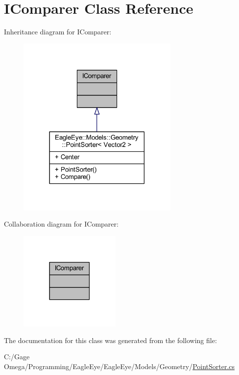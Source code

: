 \hypertarget{class_i_comparer}{}\section{I\+Comparer Class Reference}
\label{class_i_comparer}


Inheritance diagram for I\+Comparer\+:\nopagebreak
\begin{figure}[H]
\begin{center}
\leavevmode
\includegraphics[width=225pt]{class_i_comparer__inherit__graph}
\end{center}
\end{figure}


Collaboration diagram for I\+Comparer\+:\nopagebreak
\begin{figure}[H]
\begin{center}
\leavevmode
\includegraphics[width=141pt]{class_i_comparer__coll__graph}
\end{center}
\end{figure}


The documentation for this class was generated from the following file\+:\begin{DoxyCompactItemize}
\item 
C\+:/\+Gage Omega/\+Programming/\+Eagle\+Eye/\+Eagle\+Eye/\+Models/\+Geometry/\mbox{\hyperlink{_point_sorter_8cs}{Point\+Sorter.\+cs}}\end{DoxyCompactItemize}
